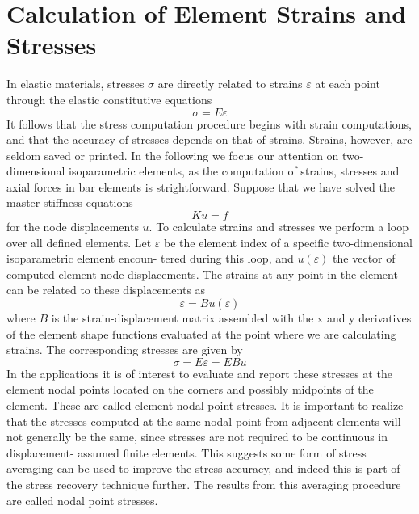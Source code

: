 \documentclass{article}
\begin{document}
\section{Calculation of Element Strains and Stresses } In elastic materials, stresses $\sigma$ are directly related to strains $\varepsilon$ at each point through the elastic constitutive equations 
\begin{equation}
	\sigma = E\varepsilon 
\end{equation}
It follows that the stress computation procedure begins with strain computations, and that the accuracy of stresses depends on that of strains. Strains, however, are seldom saved or printed. 
In the following we focus our attention on two-dimensional isoparametric elements, as the computation of strains, stresses and axial forces in bar elements is strightforward. 
Suppose that we have solved the master stiffness equations  
\begin{equation}
	Ku = f
\end{equation}
for the node displacements $u$. To calculate strains and stresses we perform a loop over all defined elements. Let $\varepsilon$ be the element index of a specific two-dimensional isoparametric element encoun- tered during this loop, and $u(\varepsilon)$ the vector of computed element node displacements. The strains at any point in the element can be related to these displacements as 
\begin{equation}
	\varepsilon = Bu(\varepsilon) 
\end{equation}
where $B$ is the strain-displacement matrix assembled with the x and y derivatives of the element shape functions evaluated at the point where we are calculating strains. The corresponding stresses are given by 
\begin{equation}
	\sigma = E\varepsilon = EBu 
\end{equation}
In the applications it is of interest to evaluate and report these stresses at the element nodal points located on the corners and possibly midpoints of the element. These are called element nodal point stresses.
It is important to realize that the stresses computed at the same nodal point from adjacent elements will not generally be the same, since stresses are not required to be continuous in displacement- assumed finite elements. This suggests some form of stress averaging can be used to improve the stress accuracy, and indeed this is part of the stress recovery technique further. The results from this averaging procedure are called nodal point stresses.
\end{document}
